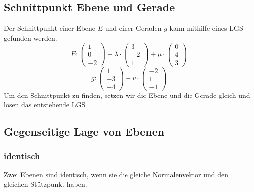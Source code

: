 \documentclass{article}
\begin{document}
\begin{minipage}[t]{0.45\textwidth}
    \subsection*{Schnittpunkt Ebene und Gerade}
    Der Schnittpunkt einer Ebene \( E \) und einer Geraden \( g \) kann mithilfe eines LGS gefunden werden. 
    \begin{equation*}
        E: \begin{pmatrix}
            1 \\
            0 \\
            -2
        \end{pmatrix} + \lambda \cdot \begin{pmatrix}
            3 \\
            -2 \\
            1
        \end{pmatrix} + \mu \cdot \begin{pmatrix}
            0 \\
            4 \\
            3
        \end{pmatrix}
    \end{equation*}
    \begin{equation*}
        g: \begin{pmatrix}
            1 \\
            -3 \\
            -4
            \end{pmatrix} + v \cdot \begin{pmatrix}
                -2 \\
                1 \\
                -1
            \end{pmatrix}
    \end{equation*}
    Um den Schnittpunkt zu finden, setzen wir die Ebene und die Gerade gleich und lösen das entstehende LGS

    \subsection*{Gegenseitige Lage von Ebenen}
    \subsubsection*{identisch}
    Zwei Ebenen sind identisch, wenn sie die gleiche Normalenvektor und den gleichen Stützpunkt haben.


\end{minipage}
\end{document}
